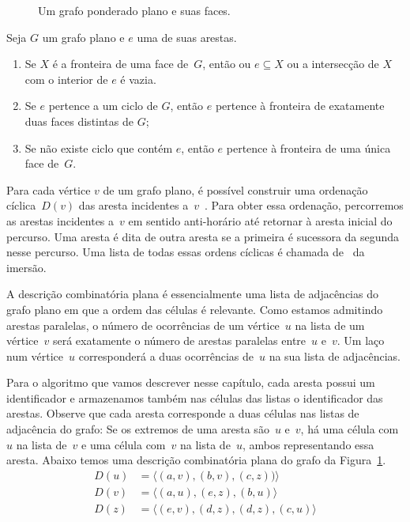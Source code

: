 \begin{figure}[htb]
\scalebox{1.5}{
\centering

}
\caption{Um grafo ponderado plano e suas faces.}
\label{fig:MSF-basico-0}
\end{figure}



\begin{lemma}
\label{lemma:diestel}
Seja $G$ um grafo plano e $e$ uma de suas arestas.
\begin{enumerate}
\item Se $X$ é a fronteira de uma face de~$G$, então ou $e\subseteq X$ ou a intersecção de $X$ com o interior de $e$ é vazia.
\item Se $e$ pertence a um ciclo de $G$, então $e$ pertence à fronteira de exatamente duas faces distintas de $G$;
\item Se não existe ciclo que contém $e$, então $e$ pertence à fronteira de uma única face de~$G$.
\end{enumerate}
\end{lemma}

Para cada vértice $v$ de um grafo plano, é possível construir uma ordenação cíclica~$D(v)$ das aresta incidentes a~$v$~\cite{noma2003}.
Para obter essa ordenação, percorremos as arestas incidentes a~$v$ em sentido anti-horário até retornar à aresta inicial do percurso.
Uma aresta é dita  de outra aresta se a primeira é sucessora da segunda nesse percurso.
Uma lista de todas essas ordens cíclicas é chamada de~ da imersão.

A descrição combinatória plana é essencialmente uma lista de adjacências do grafo plano em que a ordem das células é relevante.
Como estamos admitindo arestas paralelas, o número de ocorrências de um vértice~$u$ na lista de um vértice~$v$ será exatamente o número de arestas paralelas entre~$u$ e~$v$.
Um laço num vértice~$u$ corresponderá a duas ocorrências de~$u$ na sua lista de adjacências.

Para o algoritmo que vamos descrever nesse capítulo, cada aresta possui um identificador e armazenamos também nas células das listas o identificador das arestas.
Observe que cada aresta corresponde a duas células nas listas de adjacência do grafo:
Se os extremos de uma aresta são~$u$ e~$v$, há uma célula com~$u$ na lista de~$v$ e uma célula com~$v$ na lista de~$u$, ambos representando essa aresta.
Abaixo temos uma descrição combinatória plana do grafo da Figura~\ref{fig:MSF-basico-0}.
\begin{align*}
D(u)&=\langle (a,v), (b,v), (c,z))\rangle\\
D(v)&=\langle (a,u), (e,z), (b,u)  \rangle\\
D(z)&=\langle (e,v), (d,z), (d,z), (c,u)\rangle
\end{align*}

